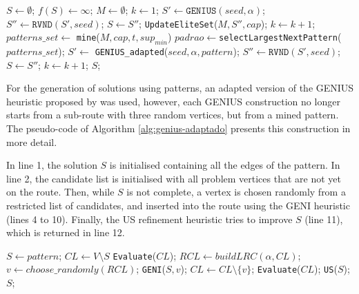 \documentclass{singlecol-new}
\begin{document}
\begin{algorithm}[!h]
	\caption{\hspace{-1mm}: \textbf{DM-GRASP}($maxIt, seed, t, cap, \alpha, sup_{min}$)}
	\label{alg:dm-grasp}
	{\footnotesize
		\begin{algorithmic}[1]		
			\STATE $S\gets \emptyset$; $f(S) \gets \infty$; $M \gets \emptyset$; $k \gets 1$; 
			\STATE $S' \gets \texttt{GENIUS} (seed, \alpha)$;  
			\STATE $S'' \gets \texttt{RVND} (S', seed)$; 
			\STATE $S \gets S''$;
			\ENDIF
			\STATE \texttt{UpdateEliteSet}($M, S'', cap$);
			\STATE $k \gets k +1$;
			\ENDWHILE
			\STATE	$patterns\_set \gets$ \texttt{mine}($M, cap, t, sup_{min}$)
			\STATE $padrao \gets $\texttt{selectLargestNextPattern}($patterns\_set$); 
			\STATE $S' \gets$ \texttt{GENIUS\_adapted}($seed, \alpha, pattern$);
			\STATE $S'' \gets \texttt{RVND} (S', seed)$;
			\STATE $S \gets S''$;
			\ENDIF
			\STATE $k \gets k +1$;
			\ENDWHILE
			\RETURN $S$;
		\end{algorithmic}
	}
\end{algorithm}

For the generation of solutions using patterns, an adapted version of the GENIUS heuristic proposed by \citet{daSilva} was used, however, each GENIUS construction no longer starts from a sub-route with three random vertices, but from a mined pattern. The pseudo-code of Algorithm \ref{alg:genius-adaptado}  presents this construction in more detail.

In line 1, the solution $S$ is initialised containing all the edges of the pattern. In line 2, the candidate list is initialised with all problem vertices that are not yet on the route. Then, while $S$ is not complete, a vertex is chosen randomly from a restricted list of candidates, and inserted into the route using the GENI heuristic (lines 4 to 10). Finally, the US refinement heuristic tries to improve $S$ (line 11), which is returned in line 12.


\begin{algorithm}[!h]
	{\small
	\caption{\hspace{-1mm}:  GENIUS\_adapted($seed, \alpha, padrao$)}
	\label{alg:genius-adaptado}
	\begin{algorithmic}[1]			
		\STATE $S \gets pattern$;
		\STATE $CL \gets V \setminus S$
		\STATE \texttt{Evaluate}($CL$);
			\STATE $RCL \gets buildLRC(\alpha, CL)$;
			\STATE $v \gets choose\_randomly(RCL)$;
			\STATE \texttt{GENI}($S, v$);
			\STATE $CL \gets CL \setminus \{v\}$;
			\STATE \texttt{Evaluate}($CL$);
		\ENDWHILE
		\STATE \texttt{US}($S$);
		\RETURN $S$;
	\end{algorithmic}
}
\end{algorithm}
\end{document}
